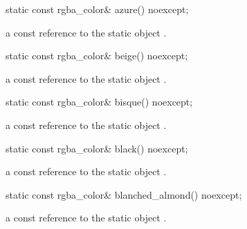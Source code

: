 \begin{itemdecl}
    static const rgba_color& azure() noexcept;
\end{itemdecl}
\begin{itemdescr}
    \pnum
    \returns
    a const reference to the static  object .
\end{itemdescr}

\begin{itemdecl}
    static const rgba_color& beige() noexcept;
\end{itemdecl}
\begin{itemdescr}
    \pnum
    \returns
    a const reference to the static  object .
\end{itemdescr}

\begin{itemdecl}
    static const rgba_color& bisque() noexcept;
\end{itemdecl}
\begin{itemdescr}
    \pnum
    \returns
    a const reference to the static  object .
\end{itemdescr}

\begin{itemdecl}
    static const rgba_color& black() noexcept;
\end{itemdecl}
\begin{itemdescr}
    \pnum
    \returns
    a const reference to the static  object .
\end{itemdescr}

\begin{itemdecl}
    static const rgba_color& blanched_almond() noexcept;
\end{itemdecl}
\begin{itemdescr}
    \pnum
    \returns
    a const reference to the static  object .
\end{itemdescr}

